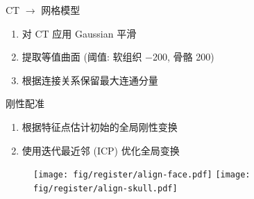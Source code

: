 \documentclass{beamer}
\begin{document}
\begin{frame}{CT $\to$ 网格模型}
  \begin{enumerate}
    \item 对 CT 应用 Gaussian 平滑
    \item 提取等值曲面 (阈值: 软组织 \num{-200}, 骨骼 \num{200})
    \item 根据连接关系保留最大连通分量
  \end{enumerate}
  \begin{figure}
    \centering
  \end{figure}
\end{frame}

\begin{frame}{刚性配准}
  \begin{enumerate}
    \item 根据特征点估计初始的全局刚性变换
    \item 使用迭代最近邻 (ICP) 优化全局变换
  \end{enumerate}
  \begin{figure}
    \centering
    \texttt{[image: fig/register/align-face.pdf]}
    \texttt{[image: fig/register/align-skull.pdf]}
  \end{figure}
\end{frame}
\end{document}
